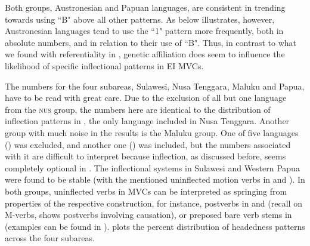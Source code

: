 \largerpage[1]
Both groups, Austronesian and Papuan languages, are consistent in trending towards using ``B" above all other patterns. As  below illustrates, however, Austronesian languages tend to use the ``1" pattern more frequently, both in absolute numbers, and in relation to their use of ``B". Thus, in contrast to what we found with referentiality in , genetic affiliation does seem to influence the likelihood of specific inflectional patterns in EI MVCs. 

The numbers for the four subareas, Sulawesi, Nusa Tenggara, Maluku and Papua, have to be read with great care. Due to the exclusion of all but one language from the \textsc{nus} group, the numbers here are identical to the distribution of inflection patterns in , the only language included in Nusa Tenggara. Another group with much noise in the results is the Maluku group. One of five languages () was excluded, and another one () was included, but the numbers associated with it are difficult to interpret because inflection, as discussed before, seems completely optional in . The inflectional systems in Sulawesi and Western Papua were found to be stable (with the mentioned uninflected motion verbs in  and ). In both groups, uninflected verbs in MVCs can be interpreted as springing from properties of the respective construction, for instance, postverbs in  and  (recall  on  M-verbs,  shows  postverbs involving causation), or preposed bare verb stems in  (examples can be found in ).  plots the percent distribution of headedness patterns across the four subareas.

